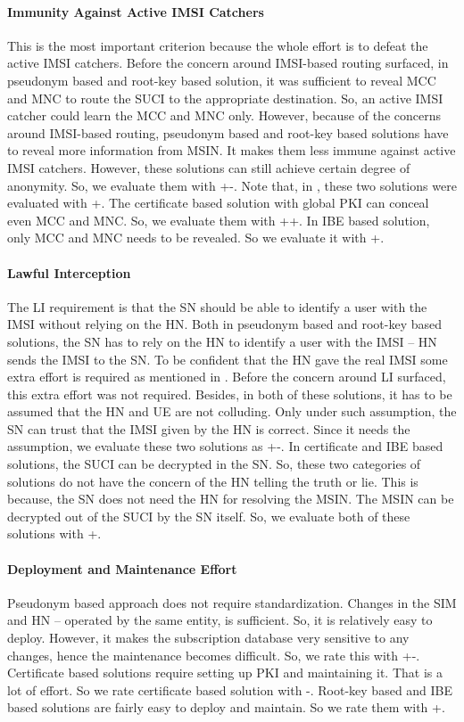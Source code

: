 \documentclass[conference]{IEEEtran}
\begin{document}
\paragraph{Immunity Against Active IMSI Catchers} This is the most important criterion because the whole effort is to defeat the active IMSI catchers. Before the concern around IMSI-based routing surfaced, in pseudonym based and root-key based solution, it was sufficient to reveal MCC and MNC to route the SUCI to the appropriate destination. So, an active IMSI catcher could learn the MCC and MNC only. However, because of the concerns around IMSI-based routing, pseudonym based and root-key based solutions have to reveal more information from MSIN. It makes them less immune against active IMSI catchers. However, these solutions can still achieve certain degree of anonymity. So, we evaluate them with +-. Note that, in \cite{ICTJournal}, these two solutions were evaluated with +. The certificate based solution with global PKI can conceal even MCC and MNC. So, we evaluate them with ++. In IBE based solution, only MCC and MNC needs to be revealed. So we evaluate it with +.

\paragraph{Lawful Interception} \label{subsection:LI}
The LI requirement is that the SN should be able to identify a user with the IMSI without relying on the HN. Both in pseudonym based and root-key based solutions, the SN has to rely on the HN to identify a user with the IMSI -- HN sends the IMSI to the SN. To be confident that the HN gave the real IMSI some extra effort is required as mentioned in \cite{NokiaLI,NokiaLI1,EricssonLI,CATTLI,KPNDOCOMOLI}. Before the concern around LI surfaced, this extra effort was not required. Besides, in both of these solutions, it has to be assumed that the HN and UE are not colluding. Only under such assumption, the SN can trust that the IMSI given by the HN is correct. Since it needs the assumption, we evaluate these two solutions as +-. In certificate and IBE based solutions, the SUCI can be decrypted in the SN. So, these two categories of solutions do not have the concern of the HN telling the truth or lie. This is because, the SN does not need the HN for resolving the MSIN. The MSIN can be decrypted out of the SUCI by the SN itself. So, we evaluate both of these solutions with +.

\paragraph{Deployment and Maintenance Effort}
Pseudonym based approach does not require standardization. Changes in the SIM and HN -- operated by the same entity, is sufficient. So, it is relatively easy to deploy. However, it makes the subscription database very sensitive to any changes, hence the maintenance becomes difficult.  So, we rate this with +-. Certificate based solutions require setting up PKI and maintaining it. That is a lot of effort. So we rate certificate based solution with -. Root-key based and IBE based solutions are fairly easy to deploy and maintain. So we rate them with +.
\end{document}
